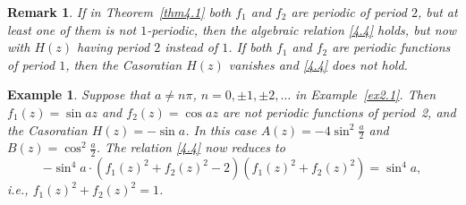 \documentclass{amsart}
\newtheorem{example}[theorem]{Example}
\newtheorem{remark}[theorem]{Remark}
\begin{document}
\begin{remark}
If in Theorem~\ref{thm4.1} both $f_1$ and $f_2$ are periodic of period $2$, but at least one of them is not $1$-periodic, then the algebraic relation \eqref{4.4} holds, but now with $H(z)$ having period $2$ instead of $1$. If both $f_1$ and $f_2$ are periodic functions of period $1$, then the Casoratian $H(z)$ vanishes and \eqref{4.4} does not hold.
\end{remark}



\begin{example}\label{ex4.1} Suppose that $a\ne n\pi$, $n=0, \pm1,\pm2,\dots$ in Example~\ref{ex2.1}. Then $f_1(z)=\sin az$ and $f_2(z)=\cos az$ are not periodic functions of period~2,
and the Casoratian $H(z)=-\sin a$. In this case $A(z)=-4\sin^2\frac{a}{2}$ and $B(z)=\cos^2\frac{a}{2}$.
The relation \eqref{4.4} now reduces to
    $$-\sin^4 a\cdot(f_1(z)^2+f_2(z)^2-2)(f_1(z)^2+f_2(z)^2)=\sin^4 a,$$
i.e., $f_1(z)^2+f_2(z)^2=1$.
\end{example}
\end{document}
